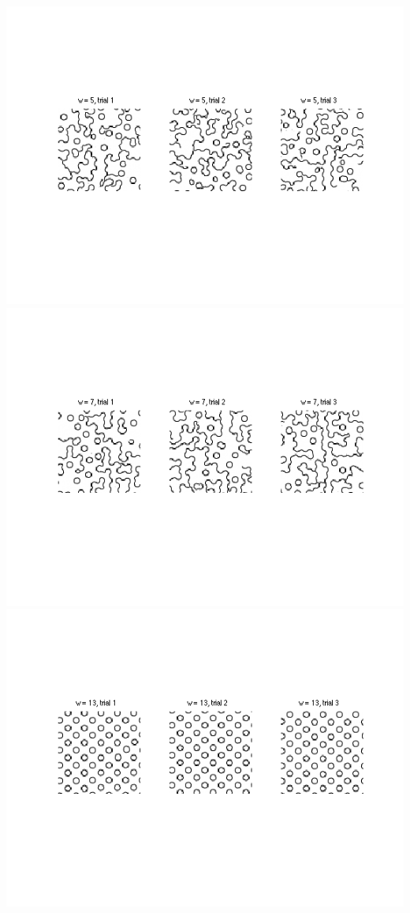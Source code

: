 \documentclass[12pt,twoside]{article}
\begin{document}
	\hspace{-20pt}
    \includegraphics[scale=1, trim = 60pt 150pt 0pt 100pt, clip]{5_2b}\newline
    \includegraphics[scale=1, trim = 60pt 150pt 0pt 100pt, clip]{5_2c}\newline
    \includegraphics[scale=1, trim = 60pt 150pt 0pt 100pt, clip]{5_2d}\newline
\end{document}
